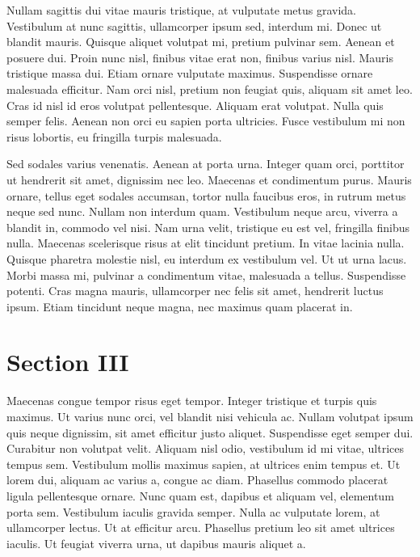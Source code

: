\documentclass{book}
\begin{document}
            Nullam sagittis dui vitae mauris tristique, at vulputate metus gravida. Vestibulum at
               nunc sagittis, ullamcorper ipsum sed, interdum mi. Donec ut blandit mauris. Quisque
               aliquet volutpat mi, pretium pulvinar sem. Aenean et posuere dui. Proin nunc nisl,
               finibus vitae erat non, finibus varius nisl. Mauris tristique massa dui. Etiam ornare
               vulputate maximus. Suspendisse ornare malesuada efficitur. Nam orci nisl, pretium non
               feugiat quis, aliquam sit amet leo. Cras id nisl id eros volutpat pellentesque.
               Aliquam erat volutpat. Nulla quis semper felis. Aenean non orci eu sapien porta
               ultricies. Fusce vestibulum mi non risus lobortis, eu fringilla turpis malesuada.
            
            Sed sodales varius venenatis. Aenean at porta urna. Integer quam orci, porttitor ut
               hendrerit sit amet, dignissim nec leo. Maecenas et condimentum purus. Mauris ornare,
               tellus eget sodales accumsan, tortor nulla faucibus eros, in rutrum metus neque sed
               nunc. Nullam non interdum quam. Vestibulum neque arcu, viverra a blandit in, commodo
               vel nisi. Nam urna velit, tristique eu est vel, fringilla finibus nulla. Maecenas
               scelerisque risus at elit tincidunt pretium. In vitae lacinia nulla. Quisque pharetra
               molestie nisl, eu interdum ex vestibulum vel. Ut ut urna lacus. Morbi massa mi,
               pulvinar a condimentum vitae, malesuada a tellus. Suspendisse potenti. Cras magna
               mauris, ullamcorper nec felis sit amet, hendrerit luctus ipsum. Etiam tincidunt neque
               magna, nec maximus quam placerat in.
         
      
   
      
         
            
\section{Section III}\label{section3}

            Maecenas congue tempor risus eget tempor. Integer tristique et turpis quis maximus.
               Ut varius nunc orci, vel blandit nisi vehicula ac. Nullam volutpat ipsum quis neque
               dignissim, sit amet efficitur justo aliquet. Suspendisse eget semper dui. Curabitur
               non volutpat velit. Aliquam nisl odio, vestibulum id mi vitae, ultrices tempus sem.
               Vestibulum mollis maximus sapien, at ultrices enim tempus et. Ut lorem dui, aliquam
               ac varius a, congue ac diam. Phasellus commodo placerat ligula pellentesque ornare.
               Nunc quam est, dapibus et aliquam vel, elementum porta sem. Vestibulum iaculis
               gravida semper. Nulla ac vulputate lorem, at ullamcorper lectus. Ut at efficitur
               arcu. Phasellus pretium leo sit amet ultrices iaculis. Ut feugiat viverra urna, ut
               dapibus mauris aliquet a.
            
\end{document}
